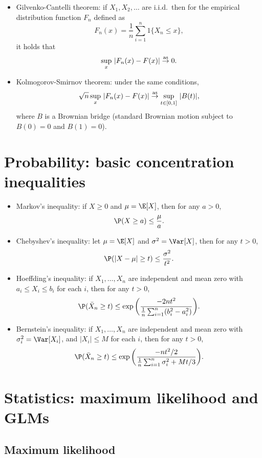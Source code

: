 \documentclass{article}
\begin{document}
\begin{itemize}
\item Gilvenko-Cantelli theorem: if $X_1,X_2,\dots$ are i.i.d.\ then for the
  empirical distribution function $F_n$ defined as 
  \[
  F_n(x) = \frac{1}{n} \sum_{i=1}^n 1\{X_n \leq x\},
  \]
  it holds that
  \[
  \sup_x \, |F_n(x) - F(x)| \overset{\mathrm{as}}{\to} 0.
  \]

\item Kolmogorov-Smirnov theorem: under the same conditions, 
  \[
  \sqrt{n} \sup_x \, |F_n(x) - F(x)| \overset{\mathrm{as}}{\to} \sup_{t \in [0,1]} \, |B(t)|,
  \]
  where $B$ is a Brownian bridge (standard Brownian motion subject to $B(0) =
  0$ and $B(1) = 0$).   
\end{itemize}

\section{Probability: basic concentration inequalities} 

\begin{itemize}
\item Markov's inequality: if $X \geq 0$ and $\mu = \E[X]$, then for any
  $a > 0$, 
  \[
  \P(X \geq a) \leq \frac{\mu}{a}.
  \]
  
\item Chebyshev's inequality: let $\mu = \E[X]$ and $\sigma^2 = \Var[X]$, then 
  for any $t > 0$,  
  \[
  \P(|X - \mu| \geq t) \leq \frac{\sigma^2}{t^2}.
  \]

\item Hoeffding's inequality: if $X_1,\dots,X_n$ are independent and mean zero
  with $a_i \leq X_i \leq b_i$ for each $i$, then for any $t > 0$,
  \[
  \P( \bar{X}_n \geq t) \leq \exp\bigg( \frac{-2nt^2}{
    \frac{1}{n}\sum_{i=1}^n (b_i^2 - a_i^2)} \bigg).
  \]

\item Bernstein's inequality: if $X_1,\dots,X_n$ are independent and mean zero
  with $\sigma_i^2 = \Var[X_i]$, and $|X_i| \leq M$ for each $i$, then for any
  $t > 0$,  
  \[
  \P( \bar{X}_n \geq t) \leq \exp\bigg( \frac{-nt^2/2}{
    \frac{1}{n}\sum_{i=1}^n \sigma_i^2 + Mt/3} \bigg).
  \]
\end{itemize}

\section{Statistics: maximum likelihood and GLMs}

\subsection{Maximum likelihood}
\end{document}

